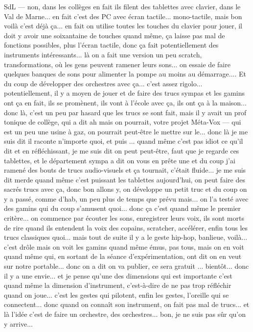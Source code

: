 SdL — non, dans les collèges en fait ils filent des tablettes avec clavier, dans le Val de Marne... en fait c'est des PC avec écran tactile... mono-tactile, mais bon voilà c'est déjà ça... en fait on utilise toutes les touches du clavier pour jouer, il doit y avoir une soixantaine de touches quand même, ça laisse pas mal de fonctions possibles, plus l'écran tactile, donc ça fait potentiellement des instruments intéressants... là on a fait une version un peu scratch, transformations, où les gens peuvent ramener leurs sons... on essaie de faire quelques banques de sons pour alimenter la pompe au moins au démarrage.... Et du coup de développer des orchestres avec ça... c'est assez rigolo... potentiellement, il y a moyen de jouer et de faire des trucs sympas et les gamins ont ça en fait, ils se promènent, ils vont à l'école avec ça, ils ont ça à la maison... donc là, c'est un peu par hasard que les trucs se sont fait, mais il y avait un prof tonique de collège, qui a dit ah mais on pourrait, votre projet Méta-Vox — qui est un peu une usine à gaz, on pourrait peut-être le mettre sur le... donc là je me suis dit il raconte n'importe quoi, et puis ... quand même c'est pas idiot ce qu'il dit et en réfléchissant, je me suis dit on peut peut-être, faut que je regarde ces tablettes, et le département sympa a dit on vous en prête une et du coup j'ai ramené des bouts de trucs audio-visuels et ça tournait, c'était fluide... je me suis dit merde quand même c'est puissant les tablettes aujourd'hui, on peut faire des sacrés trucs avec ça, donc bon allons y, on développe un petit truc et du coup on y a passé, comme d'hab, un peu plus de temps que prévu mais... on l'a testé avec des gamins qui du coup s'amusent quoi... donc ça c'est quand même le premier critère... on commence par écouter les sons, enregistrer leurs voix, ils sont morts de rire quand ils entendent la voix des copains, scratcher, accélérer, enfin tous les trucs classiques quoi... mais tout de suite il y a le geste hip-hop, banlieue, voilà... c'est drôle mais on voit les gamins quand même émus, pas tous, mais on en voit quand même qui, en sortant de la séance d'expérimentation, ont dit on en veut sur notre portable... donc on a dit on va publier, ce sera gratuit ... bientôt... donc il y a une envie... et je pense qu'une des dimensions qui est importante c'est quand même la dimension d'instrument, c'est-à-dire de ne pas trop réfléchir quand on joue... c'est les gestes qui pilotent, enfin les gestes, l'oreille qui se connectent... donc quand on connaît son instrument, on fait pas mal de trucs... et là l'idée c'est de faire un orchestre, des orchestres... bon, je ne suis pas sûr qu'on y arrive... 

